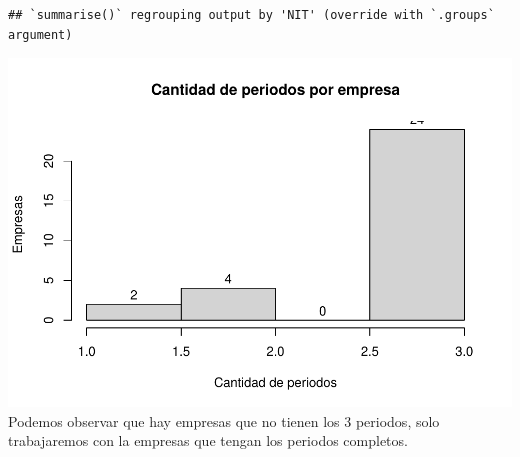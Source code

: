 \documentclass[
  11pt,
]{book}
\newenvironment{Shaded}{\begin{snugshade}}{\end{snugshade}}
\newcommand{\DataTypeTok}[1]{\textcolor[rgb]{0.13,0.29,0.53}{#1}}
\newcommand{\DecValTok}[1]{\textcolor[rgb]{0.00,0.00,0.81}{#1}}
\newcommand{\FloatTok}[1]{\textcolor[rgb]{0.00,0.00,0.81}{#1}}
\newcommand{\KeywordTok}[1]{\textcolor[rgb]{0.13,0.29,0.53}{\textbf{#1}}}
\newcommand{\NormalTok}[1]{#1}
\newcommand{\OperatorTok}[1]{\textcolor[rgb]{0.81,0.36,0.00}{\textbf{#1}}}
\newcommand{\StringTok}[1]{\textcolor[rgb]{0.31,0.60,0.02}{#1}}
\begin{document}
\begin{verbatim}
## `summarise()` regrouping output by 'NIT' (override with `.groups` argument)
\end{verbatim}

\begin{Shaded}
\end{Shaded}

\includegraphics{index_files/figure-latex/unnamed-chunk-29-1.pdf}
Podemos observar que hay empresas que no tienen los 3 periodos, solo
trabajaremos con la empresas que tengan los periodos completos.

\begin{Shaded}
\end{Shaded}
\end{document}
